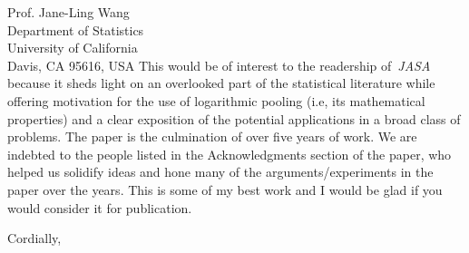 \documentclass[11pt, a4paper]{letter} %
\begin{document}
\begin{letter}{
	Prof. Jane-Ling Wang\\
	Department of Statistics\\
	University of California\\
	Davis, CA 95616, USA
}
This would be of interest to the readership of~\textit{JASA} because it sheds light on an overlooked part of the statistical literature while offering motivation for the use of logarithmic pooling (i.e, its mathematical properties) and  a clear exposition of the potential applications in a broad class of problems.
The paper is the culmination of over five years of work.
We are indebted to the people listed in the Acknowledgments section of the paper, who helped us solidify ideas and hone many of the arguments/experiments in the paper over the years. 
This is some of my best work and I would be glad if you would consider it for publication.

\closing{Cordially,}




\end{letter}
\end{document}
